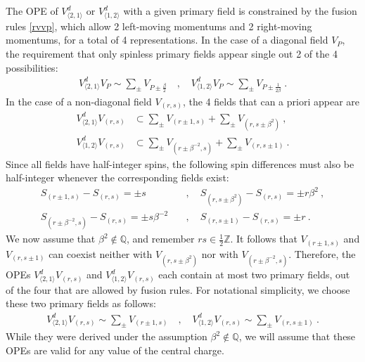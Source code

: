 \documentclass[12pt, a4paper]{article}
\theoremstyle{break}
\begin{document}
The OPE of $V^d_{\langle 2,1\rangle}$ or $V^d_{\langle 1,2\rangle}$ with a given primary field is constrained by the fusion rules \eqref{rvvp}, which allow 2 left-moving momentums and 2 right-moving momentums, for a total of 4 representations.  In the case of a diagonal field $V_P$, the requirement that only spinless primary fields appear single out 2 of the 4 possibilities:
\begin{align}
 \boxed{V^d_{\langle 2,1\rangle} V_P \sim \sum_\pm V_{P\pm\frac{\beta}{2}}} \quad , \quad \boxed{V^d_{\langle 1,2\rangle} V_P \sim \sum_\pm V_{P\pm\frac{1}{2\beta}}} \ . 
 \label{vpope}
\end{align}
In the case of a non-diagonal field $V_{(r,s)}$, the 4 fields that can a priori appear are
\begin{align}
 V^d_{\langle 2,1\rangle}V_{(r,s)} &\subset \sum_\pm V_{(r\pm 1,s)} + \sum_\pm V_{(r,s\pm \beta^2)}\ ,
 \label{vtovrs}
 \\
 V^d_{\langle 1,2\rangle}V_{(r,s)} &\subset \sum_\pm V_{(r\pm \beta^{-2},s)} + \sum_\pm V_{(r,s\pm 1)}\ .
 \label{votvrs}
\end{align}
Since all fields have half-integer spins, the following spin differences must also be half-integer whenever the corresponding fields exist: 
\begin{align}
 S_{(r\pm 1,s)} - S_{(r,s)} = \pm s &\quad , \quad S_{(r,s\pm \beta^2)} - S_{(r,s)} = \pm r\beta^2\ ,
 \label{sdiff1}
 \\
 S_{(r\pm \beta^{-2},s)} - S_{(r,s)} = \pm s\beta^{-2} &\quad , \quad S_{(r,s\pm 1)} - S_{(r,s)} = \pm r\ . 
 \label{sdiff2}
\end{align}
We now assume that $\beta^2\notin \mathbb{Q}$, and remember $rs\in\frac12\mathbb{Z}$. It follows that $V_{(r\pm 1,s)}$ and $V_{(r,s\pm 1)}$ can coexist neither with $V_{(r,s\pm \beta^2)}$ nor with $V_{(r\pm \beta^{-2},s)}$. Therefore, the OPEs $V^d_{\langle 2,1\rangle}V_{(r,s)}$ and $V^d_{\langle 1,2\rangle}V_{(r,s)}$ each contain at most two primary fields, out of the four that are allowed by fusion rules. For notational simplicity, we choose these two primary fields as follows: 
\begin{align}
 \boxed{V^d_{\langle 2,1\rangle}V_{(r,s)} \sim \sum_\pm V_{(r\pm 1,s)}} \quad ,\quad
 \boxed{V^d_{\langle 1,2\rangle}V_{(r,s)} \sim \sum_\pm V_{(r,s\pm 1)}}\ . 
 \label{vdvrs}
\end{align}
While they were derived under the assumption $\beta^2\notin \mathbb{Q}$, we will assume that these OPEs are valid for any value of the central charge. 
\end{document}
